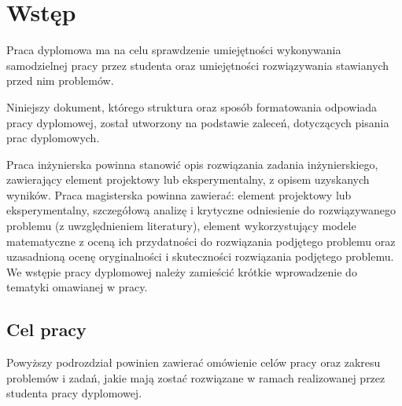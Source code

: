 
\chapter{Wstęp}
\label{sec:chapter1}


Praca dyplomowa ma na celu sprawdzenie umiejętności wykonywania samodzielnej pracy przez studenta oraz umiejętności rozwiązywania stawianych przed nim problemów.

Niniejszy dokument, którego struktura oraz sposób formatowania odpowiada pracy dyplomowej, został utworzony na podstawie zaleceń, dotyczących pisania prac dyplomowych.

Praca inżynierska powinna stanowić opis rozwiązania zadania inżynierskiego, zawierający element projektowy lub eksperymentalny, z opisem uzyskanych wyników. Praca magisterska powinna zawierać: element projektowy lub eksperymentalny, szczegółową analizę i krytyczne odniesienie do rozwiązywanego problemu (z uwzględnieniem literatury), element wykorzystujący modele matematyczne z oceną ich przydatności do rozwiązania podjętego problemu oraz uzasadnioną ocenę oryginalności i skuteczności rozwiązania podjętego problemu.
We wstępie pracy dyplomowej należy zamieścić krótkie wprowadzenie do tematyki omawianej w pracy.

\section{Cel pracy}
\label{sec:1:chapter1}
Powyższy podrozdział powinien zawierać omówienie celów pracy oraz zakresu problemów i zadań, jakie mają zostać rozwiązane w ramach realizowanej przez studenta pracy dyplomowej.



